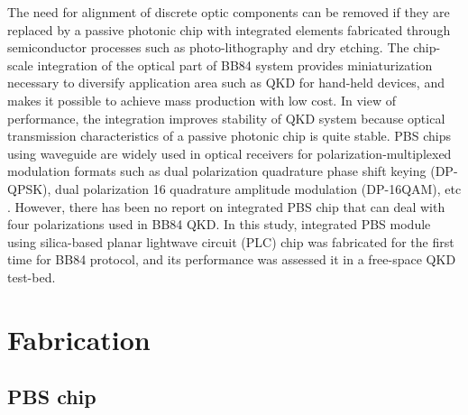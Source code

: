 \documentclass[letterpaper, 10pt]{article}
\begin{document}
The need for alignment of discrete optic components can be removed if they are replaced by  a passive photonic chip with integrated elements
fabricated through semiconductor processes such as photo-lithography and dry etching.
The chip-scale integration of the optical part of BB84 system provides miniaturization necessary to diversify application area such as QKD for hand-held devices, and makes it possible to achieve mass production with low cost.
In view of performance, the integration improves stability of QKD system because optical transmission characteristics of a passive photonic chip is quite stable.
PBS chips using waveguide are widely used in optical receivers for polarization-multiplexed modulation formats such as dual polarization quadrature phase shift keying (DP-QPSK), dual polarization 16 quadrature amplitude modulation (DP-16QAM), etc  \cite{Lee:2016bg,PoDong:2014kj}.
However, there has been no report on integrated PBS chip that can deal with four polarizations used in BB84 QKD.
In this study, integrated PBS module using  silica-based planar lightwave circuit (PLC) chip was fabricated for the first time for BB84 protocol, and its performance was assessed it in a free-space QKD test-bed.

\section{Fabrication}
\subsection{PBS chip}
\end{document}
